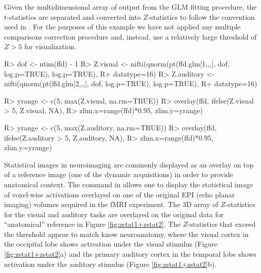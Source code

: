 \documentclass[
]{jss}
\begin{document}
Given the multidimensional array of output from the GLM fitting
procedure, the \(t\)-statistics are separated and converted into
\(Z\)-statistics to follow the convention used in . For the
purposes of this example we have not applied any multiple comparisons
correction procedure and, instead, use a relatively large threshold of
\(Z>5\) for visualization.

\begin{CodeChunk}

\begin{CodeInput}
R> dof <- ntim(ffd) - 1
R> Z.visual <- nifti(qnorm(pt(ffd.glm[1,,,], dof, log.p=TRUE), log.p=TRUE),
R+                   datatype=16)
R> Z.auditory <- nifti(qnorm(pt(ffd.glm[2,,,], dof, log.p=TRUE), log.p=TRUE),
R+                     datatype=16)
\end{CodeInput}
\end{CodeChunk}

\begin{CodeChunk}

\begin{CodeInput}
R> yrange <- c(5, max(Z.visual, na.rm=TRUE))
R> overlay(ffd, ifelse(Z.visual > 5, Z.visual, NA), 
R>         zlim.x=range(ffd)*0.95, zlim.y=yrange)
\end{CodeInput}
\end{CodeChunk}

\begin{CodeChunk}

\begin{CodeInput}
R> yrange <- c(5, max(Z.auditory, na.rm=TRUE))
R> overlay(ffd, ifelse(Z.auditory > 5, Z.auditory, NA), 
R>         zlim.x=range(ffd)*0.95, zlim.y=yrange)
\end{CodeInput}
\end{CodeChunk}

Statistical images in neuroimaging are commonly displayed as an overlay
on top of a reference image (one of the dynamic acquisitions) in order
to provide anatomical context. The  command in
 allows one to display the statistical image of
voxel-wise activations overlayed on one of the original EPI (echo planar
imaging) volumes acquired in the fMRI experiment. The 3D array of
\(Z\)-statistics for the visual and auditory tasks are overlayed on the
original data for ``anatomical'' reference in Figure
\ref{fig:zstat1+zstat2}. The \(Z\)-statistics that exceed the threshold
appear to match know neuroanatomy, where the visual cortex in the
occipital lobe shows activation under the visual stimulus (Figure
\ref{fig:zstat1+zstat2}a) and the primary auditory cortex in the
temporal lobe shows activation under the auditory stimulus (Figure
\ref{fig:zstat1+zstat2}b).
\end{document}
